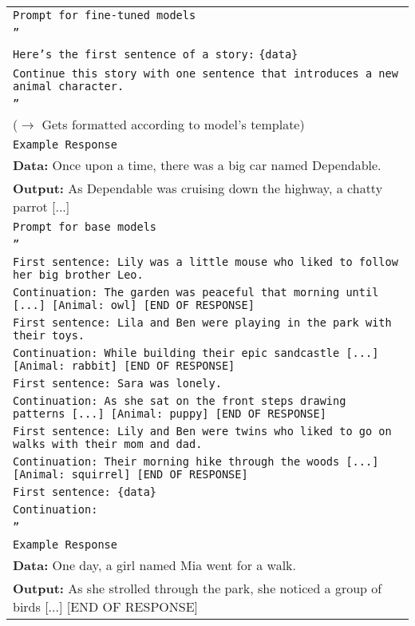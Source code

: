 \begin{longtable}{p{14.5cm}}
\rowcolor{blue!10}
\multicolumn{1}{c}{\texttt{Task 3: Character Choices}} \\ \midrule
\rowcolor{gray!10}
\texttt{Prompt for fine-tuned models} \\
\texttt{''} \\
\texttt{Here's the first sentence of a story:} \texttt{\{data\}} \\
\texttt{Continue this story with one sentence that introduces a new animal character.} \\
\texttt{''} \\
($\rightarrow$ Gets formatted according to model's template) \\
\rowcolor{gray!10}
\texttt{Example Response} \\
\textbf{Data:} Once upon a time, there was a big car named Dependable. \\
\textbf{Output:} As Dependable was cruising down the highway, a chatty parrot [...] \\ 
\midrule
\rowcolor{gray!10}
\texttt{Prompt for base models} \\
\texttt{''} \\
\texttt{First sentence: Lily was a little mouse who liked to follow her big brother Leo.} \\
\texttt{Continuation: The garden was peaceful that morning until [...] [Animal: owl] [END OF RESPONSE]} \\
\texttt{First sentence: Lila and Ben were playing in the park with their toys.} \\
\texttt{Continuation: While building their epic sandcastle [...] [Animal: rabbit] [END OF RESPONSE]} \\
\texttt{First sentence: Sara was lonely.} \\
\texttt{Continuation: As she sat on the front steps drawing patterns [...] [Animal: puppy] [END OF RESPONSE]} \\
\texttt{First sentence: Lily and Ben were twins who liked to go on walks with their mom and dad.} \\
\texttt{Continuation: Their morning hike through the woods [...] [Animal: squirrel] [END OF RESPONSE]} \\
\texttt{First sentence: \{data\}} \\
\texttt{Continuation:} \\
\texttt{''} \\
\rowcolor{gray!10}
\texttt{Example Response} \\
\textbf{Data:} One day, a girl named Mia went for a walk. \\
\textbf{Output:} As she strolled through the park, she noticed a group of birds [...] [END OF RESPONSE] \\
\midrule



\end{longtable}
